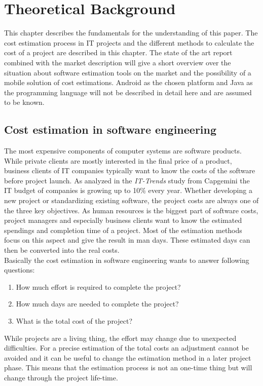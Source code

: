 \chapter{Theoretical Background}

This chapter describes the fundamentals for the understanding of this paper. The cost estimation process in IT projects and the different methods to calculate the cost of a project are described in this chapter. The state of the art report combined with the market description will give a short overview over the situation about software estimation tools on the market and the possibility of a mobile solution of cost estimations. Android as the chosen platform and Java as the programming language will not be described in detail here and are assumed to be known.

\section{Cost estimation in software engineering}

The most expensive components of computer systems are software products. While private clients are mostly interested in the final price of a product, business clients of IT companies typically want to know the costs of the software before project launch. As analyzed in the \textit{IT-Trends} study from Capgemini \cite{capgemini} the IT budget of companies is growing up to 10\% every year. Whether developing a new project or standardizing existing software, the project costs are always one of the three key objectives. As human resources is the biggest part of software costs, project managers and especially business clients want to know the estimated spendings and completion time of a project. Most of the estimation methods focus on this aspect and give the result in man days. These estimated days can then be converted into the real costs.
\\
Basically the cost estimation in software engineering wants to answer following questions:
\begin{enumerate}
\item How much effort is required to complete the project?
\item How much days are needed to complete the project?
\item What is the total cost of the project?
\end{enumerate}
While projects are a living thing, the effort may change due to unexpected difficulties. For a precise estimation of the total costs an adjustment cannot be avoided and it can be useful to change the estimation method in a later project phase. This means that the estimation process is not an one-time thing but will change through the project life-time. 


